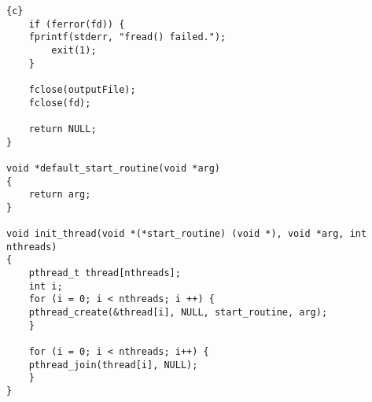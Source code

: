 \begin{lstlisting}{c}
    if (ferror(fd)) {
	fprintf(stderr, "fread() failed.");
        exit(1);
    }

    fclose(outputFile);
    fclose(fd);
 
    return NULL;
}

void *default_start_routine(void *arg)
{
    return arg;
}

void init_thread(void *(*start_routine) (void *), void *arg, int nthreads)
{
    pthread_t thread[nthreads];
    int i;
    for (i = 0; i < nthreads; i ++) {
	pthread_create(&thread[i], NULL, start_routine, arg);
    }

    for (i = 0; i < nthreads; i++) {
	pthread_join(thread[i], NULL);
    }
}
\end{lstlisting}
